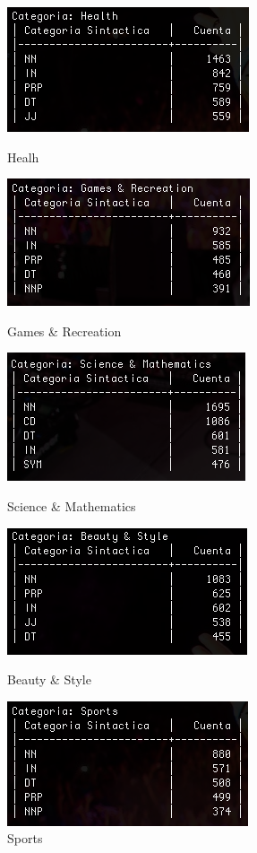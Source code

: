 \documentclass{article}
\begin{document}
\newpage
\begin{figure}
\centering
\includegraphics[scale=0.5]{figuras/cat6.png}
\caption{Healh}
\label{fig:cat6}
\includegraphics[scale=0.5]{figuras/cat7.png}
\caption{Games \& Recreation}
\label{fig:cat7}
\includegraphics[scale=0.5]{figuras/cat8.png}
\caption{Science \& Mathematics}
\label{fig:cat8}
\includegraphics[scale=0.5]{figuras/cat9.png}
\caption{Beauty \& Style}
\label{fig:cat9}
\includegraphics[scale=0.5]{figuras/cat10.png}
\caption{Sports}
\label{fig:cat10}
\end{figure}
\end{document}

